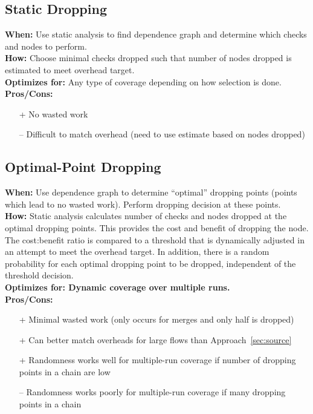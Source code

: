 \documentclass[11pt, letterpaper]{article}
\begin{document}
\subsection{Static Dropping}
\label{sec:static}
\textbf{When: } Use static analysis to find dependence graph and determine
which checks and nodes to perform. \\
\textbf{How: } Choose minimal checks dropped such that number of nodes dropped
is estimated to meet overhead target. \\
\textbf{Optimizes for: } Any type of coverage depending on how selection is done. \\
\textbf{Pros/Cons: }
\begin{itemize}
  \item[+] No wasted work
  \item[--] Difficult to match overhead (need to use estimate based on nodes dropped)
\end{itemize}

\subsection{Optimal-Point Dropping}
\label{sec:opt}
\textbf{When: } Use dependence graph to determine ``optimal'' dropping points
(points which lead to no wasted work). Perform dropping decision at these
points. \\
\textbf{How: } Static analysis calculates number of checks and nodes dropped at
the optimal dropping points. This provides the cost and benefit of dropping the
node. The cost:benefit ratio is compared to a threshold that is dynamically
adjusted in an attempt to meet the overhead target. In addition, there is a
random probability for each optimal dropping point to be dropped, independent
of the threshold decision. \\
\textbf{Optimizes for: Dynamic coverage over multiple runs.} \\
\textbf{Pros/Cons: }
\begin{itemize}
  \item[+] Minimal wasted work (only occurs for merges and only half is dropped)
  \item[+] Can better match overheads for large flows than Approach~\ref{sec:source}
  \item[+] Randomness works well for multiple-run coverage if number of dropping points in a chain are low
  \item[--] Randomness works poorly for multiple-run coverage if many dropping points in a chain
\end{itemize}
\end{document}
